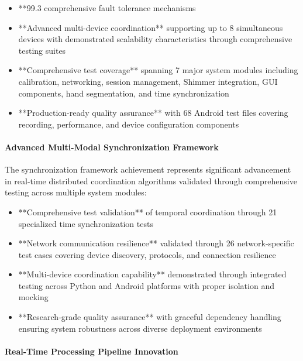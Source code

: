 \documentclass[12pt,a4paper]{article}
\begin{document}
\begin{itemize}
\item **99.3%
  comprehensive fault tolerance mechanisms
\item **Advanced multi-device coordination** supporting up to 8 simultaneous devices with demonstrated scalability 
  characteristics through comprehensive testing suites
\item **Comprehensive test coverage** spanning 7 major system modules including calibration, networking, session 
  management, Shimmer integration, GUI components, hand segmentation, and time synchronization
\item **Production-ready quality assurance** with 68 Android test files covering recording, performance, and device 
  configuration components

\end{itemize}
\paragraph{Advanced Multi-Modal Synchronization Framework}

The synchronization framework achievement represents significant advancement in real-time distributed coordination
algorithms validated through comprehensive testing across multiple system modules:

\begin{itemize}
\item **Comprehensive test validation** of temporal coordination through 21 specialized time synchronization tests
\item **Network communication resilience** validated through 26 network-specific test cases covering device discovery, 
  protocols, and connection resilience
\item **Multi-device coordination capability** demonstrated through integrated testing across Python and Android 
  platforms with proper isolation and mocking
\item **Research-grade quality assurance** with graceful dependency handling ensuring system robustness across diverse 
  deployment environments

\end{itemize}
\paragraph{Real-Time Processing Pipeline Innovation}
\end{document}
